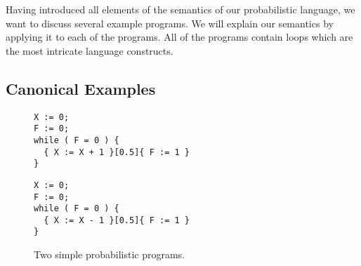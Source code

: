 Having introduced all elements of the semantics of our probabilistic language, we want to discuss several example programs.
We will explain our semantics by applying it to each of the programs.
All of the programs contain loops which are the most intricate language constructs.

\subsection{Canonical Examples}
\label{ssec:canonical_examples}

\begin{figure}[t]
	\begin{minipage}[t]{0.5\textwidth}
		\begin{lstlisting}[caption=Canonical example]
X := 0;
F := 0;
while ( F = 0 ) {
  { X := X + 1 }[0.5]{ F := 1 }
}
		\end{lstlisting}
	\end{minipage}
	\begin{minipage}[t]{0.5\textwidth}
		\begin{lstlisting}[caption=Inverse canonical example]
X := 0;
F := 0;
while ( F = 0 ) {
  { X := X - 1 }[0.5]{ F := 1 }
}
		\end{lstlisting}
	\end{minipage}
	\caption{Two simple probabilistic programs. \label{fig:canonicals2}}
\end{figure}

